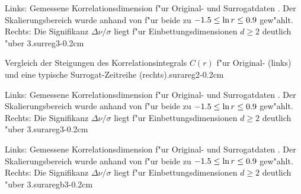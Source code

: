{Links: Gemessene Korrelationsdimension f"ur Original- \captimes und Surrogatdaten
\capplus. Der Skalierungsbereich wurde anhand von  f"ur beide 
zu $-1.5\leq\ln r\leq\-0.9$ gew"ahlt. Rechts: Die Signifikanz $\Delta\nu/\sigma$ liegt
f"ur Einbettungsdimensionen $d\geq 2$ deutlich "uber $3$.}{surreg3}{-0.2cm} 


\newpage


{Vergleich der Steigungen des Korrelationsintegrals $C(r)$ f"ur Original- (links) und eine
typische Surrogat-Zeitreihe (rechts).}{surareg2}{-0.2cm}

{Links: Gemessene Korrelationsdimension f"ur Original- \captimes und Surrogatdaten
\capplus. Der Skalierungsbereich wurde anhand von  f"ur beide 
zu $-1.5\leq\ln r\leq\-0.9$ gew"ahlt. Rechts: Die Signifikanz $\Delta\nu/\sigma$ liegt
f"ur Einbettungsdimensionen $d\geq 2$ deutlich "uber $3$.}{surareg3}{-0.2cm} 

{Links: Gemessene Korrelationsdimension f"ur Original- \captimes und Surrogatdaten
\capplus. Der Skalierungsbereich wurde anhand von  f"ur beide 
zu $-1.5\leq\ln r\leq\-0.9$ gew"ahlt. Rechts: Die Signifikanz $\Delta\nu/\sigma$ liegt
f"ur Einbettungsdimensionen $d\geq 2$ deutlich "uber $3$.}{suraregb3}{-0.2cm} 











